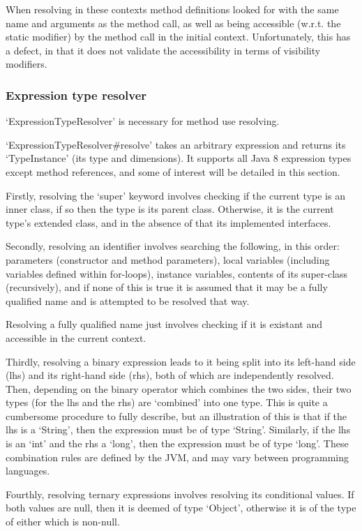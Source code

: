 \documentclass[12pt, letterpaper]{article}
\begin{document}
When resolving in these contexts method definitions looked for with the same name and arguments as the method call, as well as being accessible (w.r.t. the static modifier) by the method call in the initial context.
Unfortunately, this has a defect, in that it does not validate the accessibility in terms of visibility modifiers.

\subsubsection{Expression type resolver}
`ExpressionTypeResolver' is necessary for method use resolving.

`ExpressionTypeResolver\#resolve' takes an arbitrary expression and returns its `TypeInstance' (its type and dimensions).
It supports all Java 8 expression types except method references, and some of interest will be detailed in this section.

Firstly, resolving the `super' keyword involves checking if the current type is an inner class, if so then the type is its parent class.
Otherwise, it is the current type's extended class, and in the absence of that its implemented interfaces.

Secondly, resolving an identifier involves searching the following, in this order: parameters (constructor and method parameters), local variables (including variables defined within for-loops), instance variables, contents of its super-class (recursively), and if none of this is true it is assumed that it may be a fully qualified name and is attempted to be resolved that way.

Resolving a fully qualified name just involves checking if it is existant and accessible in the current context.

Thirdly, resolving a binary expression leads to it being split into its left-hand side (lhs) and its right-hand side (rhs), both of which are independently resolved.
Then, depending on the binary operator which combines the two sides, their two types (for the lhs and the rhs) are `combined' into one type.
This is quite a cumbersome procedure to fully describe, but an illustration of this is that if the lhs is a `String', then the expression must be of type `String'.
Similarly, if the lhs is an `int' and the rhs a `long', then the expression must be of type `long'.
These combination rules are defined by the JVM, and may vary between programming languages.

Fourthly, resolving ternary expressions involves resolving its conditional values.
If both values are null, then it is deemed of type `Object', otherwise it is of the type of either which is non-null.
\end{document}
